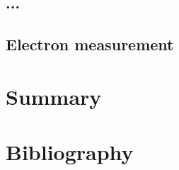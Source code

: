 \begin{refsection}
	\subsection{...}
	\subsection{Electron measurement}

	\section{Summary}
	\label{ch4:Summary}

	\cleardoublepage
	\section{Bibliography}
	\label{ch4:bib}
	\printbibliography[heading=subbibliography]
\end{refsection}